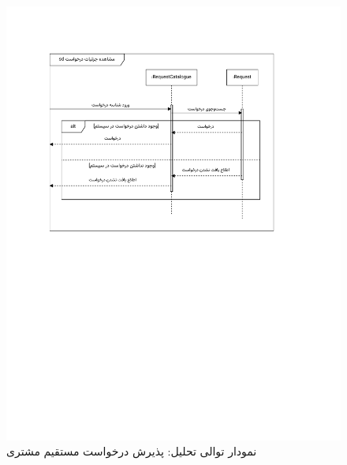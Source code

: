 \begin{figure}[ht!]
	\centering
	\includegraphics[scale=0.8, page=3]{figs/OOD-Sequence-2.pdf}
	\caption{نمودار توالی تحلیل: پذیرش درخواست مستقیم مشتری}
\end{figure}
\FloatBarrier
\newpage

